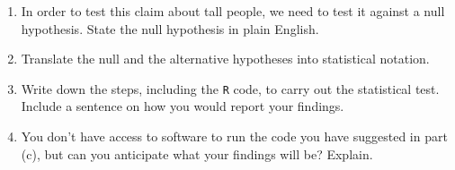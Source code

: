 \documentclass[letterpaper,11pt,twoside,]{pinp}
\providecommand{\tightlist}{%
  \setlength{\itemsep}{0pt}\setlength{\parskip}{0pt}}
\begin{document}
\begin{enumerate}
\def\labelenumi{\alph{enumi}.}
\tightlist
\item
  In order to test this claim about tall people, we need to test it
  against a null hypothesis. State the null hypothesis in plain English.
\item
  Translate the null and the alternative hypotheses into statistical
  notation.
\item
  Write down the steps, including the \texttt{R} code, to carry out the
  statistical test. Include a sentence on how you would report your
  findings.
\item
  You don't have access to software to run the code you have suggested
  in part (c), but can you anticipate what your findings will be?
  Explain.
\end{enumerate}





\end{document}
